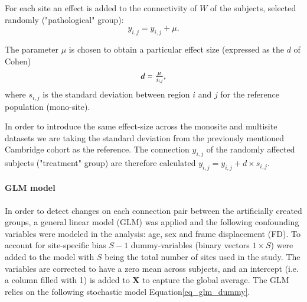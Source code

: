 \documentclass[authoryear]{elsarticle}
\begin{document}
For each site an effect is added to the connectivity of $W$ of the subjects, selected randomly ("pathological" group):
\begin{equation}
	y_{i,j} = y_{i,j} + \mu.
\end{equation}

The parameter $\mu$ is chosen to obtain a particular effect size (expressed as the $d$ of Cohen)
\begin{equation}
\label{eq_cohen}
   \begin{array}{l l}
     d = \frac{\mu}{s_{i,j}},     
   \end{array}
\end{equation}
where $s_{i,j}$ is the standard deviation between region $i$ and $j$ for the reference population (mono-site). 

In order to introduce the same effect-size across the monosite and multisite datasets we are taking the standard deviation from the previously mentioned Cambridge cohort as the reference.  The connection $y_{i,j}$ of the randomly affected subjects ("treatment" group) are therefore calculated $y_{i,j} = y_{i,j} + d\times s_{i,j}$.

\paragraph{GLM model}
In order to detect changes on each connection pair between the artificially created groups, a general linear model (GLM) was applied and the following confounding variables were modeled in the analysis: age, sex and frame displacement (FD). To account for site-specific bias $S-1$ dummy-variables (binary vectors $1\times S$) were added to the model with $S$ being the total number of sites used in the study. The variables are corrected to have a zero mean across subjects, and an intercept (i.e. a column filled with 1) is added to $\mathbf{X}$ to capture the global average. The GLM relies on the following stochastic model Equation\ref{eq_glm_dummy}.
\end{document}
